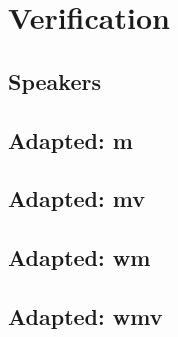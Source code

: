 \chapter{Verification}
\label{apx:results-verify}

\section{Speakers}

\newpage
\section{Adapted: m}

\newpage
\section{Adapted: mv}

\newpage
\section{Adapted: wm}

\newpage
\section{Adapted: wmv}
